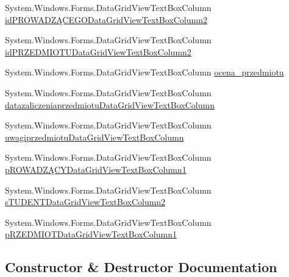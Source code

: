 \begin{DoxyCompactItemize}
\item 
System.\+Windows.\+Forms.\+Data\+Grid\+View\+Text\+Box\+Column \hyperlink{class_dziennik_ocen_1_1_form_admin_a11d4f04b47905b536faf7ad754965fec}{id\+P\+R\+O\+W\+A\+D\+ZĄ\+C\+E\+G\+O\+Data\+Grid\+View\+Text\+Box\+Column2}
\item 
System.\+Windows.\+Forms.\+Data\+Grid\+View\+Text\+Box\+Column \hyperlink{class_dziennik_ocen_1_1_form_admin_a2e1c5c7ed8ee06604fff20abcadbe193}{id\+P\+R\+Z\+E\+D\+M\+I\+O\+T\+U\+Data\+Grid\+View\+Text\+Box\+Column2}
\item 
System.\+Windows.\+Forms.\+Data\+Grid\+View\+Text\+Box\+Column \hyperlink{class_dziennik_ocen_1_1_form_admin_ad0e7bec9f88f5562daa2ef39251ae18f}{ocena\+\_\+przedmiotu}
\item 
System.\+Windows.\+Forms.\+Data\+Grid\+View\+Text\+Box\+Column \hyperlink{class_dziennik_ocen_1_1_form_admin_a1e12e925c65d4f38e5a3cb3a490c47e6}{datazaliczeniaprzedmiotu\+Data\+Grid\+View\+Text\+Box\+Column}
\item 
System.\+Windows.\+Forms.\+Data\+Grid\+View\+Text\+Box\+Column \hyperlink{class_dziennik_ocen_1_1_form_admin_a79c1dedbf916f5d973bb341600309f8d}{uwagiprzedmiotu\+Data\+Grid\+View\+Text\+Box\+Column}
\item 
System.\+Windows.\+Forms.\+Data\+Grid\+View\+Text\+Box\+Column \hyperlink{class_dziennik_ocen_1_1_form_admin_a53b38f04a035a58f34d8ce1f63ee60f1}{p\+R\+O\+W\+A\+D\+ZĄ\+C\+Y\+Data\+Grid\+View\+Text\+Box\+Column1}
\item 
System.\+Windows.\+Forms.\+Data\+Grid\+View\+Text\+Box\+Column \hyperlink{class_dziennik_ocen_1_1_form_admin_af140ea06c84a962f3b880ce5e4b043d3}{s\+T\+U\+D\+E\+N\+T\+Data\+Grid\+View\+Text\+Box\+Column2}
\item 
System.\+Windows.\+Forms.\+Data\+Grid\+View\+Text\+Box\+Column \hyperlink{class_dziennik_ocen_1_1_form_admin_a07c80c90ba741ffe4ad7583fede66f15}{p\+R\+Z\+E\+D\+M\+I\+O\+T\+Data\+Grid\+View\+Text\+Box\+Column1}
\end{DoxyCompactItemize}


\subsection{Constructor \& Destructor Documentation}
\mbox{\label{class_dziennik_ocen_1_1_form_admin_a56c723984192ed6599a2f426a7b03b56}} 
